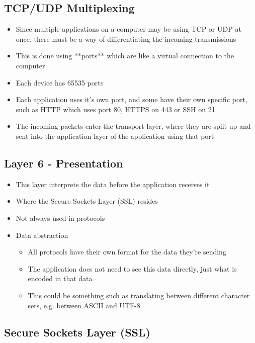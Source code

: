 \subsection*{TCP/UDP Multiplexing}

\begin{itemize}
  \item Since multiple applications on a computer may be using TCP or UDP at once, there must be a way of differentiating the incoming transmissions
  \item This is done using **ports** which are like a virtual connection to the computer
  \item Each device has 65535 ports
  \item Each application uses it's own port, and some have their own specific port, such as HTTP which uses port 80, HTTPS on 443 or SSH on 21
  \item The incoming packets enter the transport layer, where they are split up and sent into the application layer of the application using that port
\end{itemize}

\subsection*{Layer 6 - Presentation}

\begin{itemize}
  \item This layer interprets the data before the application receives it
  \item Where the Secure Sockets Layer (SSL) resides
  \item Not always used in protocols
  \item Data abstraction
  \begin{itemize}
    \item All protocols have their own format for the data they're sending
    \item The application does not need to see this data directly, just what is encoded in that data
    \item This could be something such as translating between different character sets, e.g. between ASCII and UTF-8
  \end{itemize}
\end{itemize}

\subsection*{Secure Sockets Layer (SSL)}

